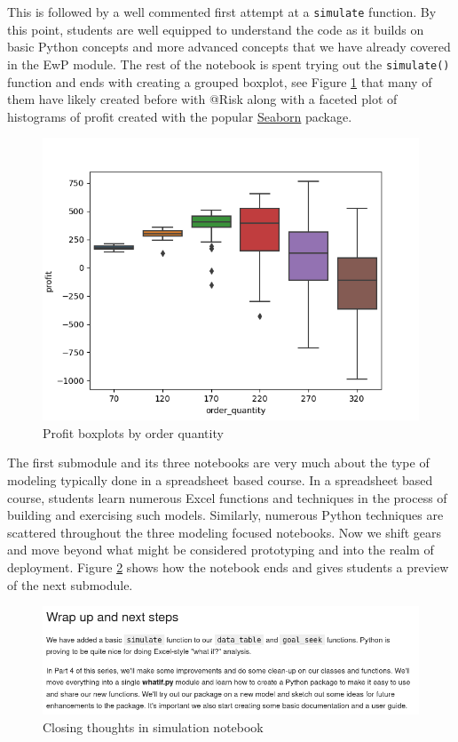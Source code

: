 \documentclass[ited,blindrev]{informs3}              %
\newcommand{\code}[1]{\texttt{#1}}
\begin{document}
This is followed by a well commented first attempt at a \code{simulate} function. By this point, students are well equipped to understand the code as it builds on basic Python concepts and more advanced concepts that we have already covered in the EwP module. The rest of the notebook is spent trying out the \code{simulate()} function and ends with creating a grouped boxplot, see Figure \ref{fig:boxplot} that many of them have likely created before with @Risk along with a faceted plot of histograms of profit created with the popular \href{https://seaborn.pydata.org/}{Seaborn} package.

\begin{figure}[!htbp]
	\centering
	\includegraphics[width=1.0\textwidth]{images/boxplots.png}
	\caption{Profit boxplots by order quantity}
	\label{fig:boxplot}
\end{figure}

The first submodule and its three notebooks are very much about the type of modeling typically done in a spreadsheet based course. In a spreadsheet based course, students learn numerous Excel functions and techniques in the process of building and exercising such models. Similarly, numerous Python techniques are scattered throughout the three modeling focused notebooks. Now we shift gears and move beyond what might be considered prototyping and into the realm of deployment. Figure \ref{fig:sim_wrapup} shows how the notebook ends and gives students a preview of the next submodule.

\begin{figure}[!htbp]
	\centering
	\includegraphics[scale=0.5]{images/sim_wrapup.png}
	\caption{Closing thoughts in simulation notebook}
	\label{fig:sim_wrapup}
\end{figure}
\end{document}
